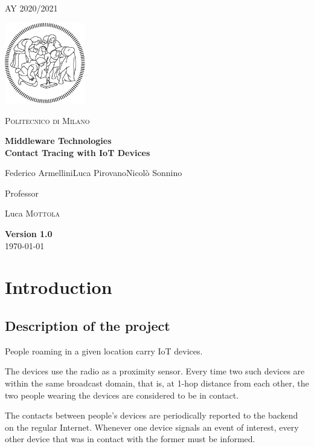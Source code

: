 \documentclass[table, 12pt]{article}
\begin{document}
\begin{titlepage}
    \centering
    {\scshape\large AY 2020/2021 \par}
    \vfill
    \includegraphics[width=100pt]{assets/logo-polimi-new}\par\vspace{1cm}
    {\scshape\LARGE Politecnico di Milano \par}
    \vspace{1.5cm}
    {\huge\bfseries Middleware Technologies\\Contact Tracing with IoT Devices\par}
    \vspace{2cm}
    {\Large {Federico Armellini\quad Luca Pirovano\quad Nicolò Sonnino}\par}
    \vfill
    {\large Professor\par
        Luca \textsc{Mottola}}
    \vfill
    {\large \textbf{Version 1.0}\\ \today \par}
\end{titlepage}
\thispagestyle{plain}
\mbox{}
\newpage
{}
\tableofcontents
\newpage
{}
\section{Introduction}
\subsection{Description of the project}
People roaming in a given location carry IoT devices.

The devices use the radio as a proximity sensor. Every time
two such devices are within the same broadcast domain, that is, at 1-hop distance from each other, the two
people wearing the devices are considered to be in contact.

The contacts between people’s devices are
periodically reported to the backend on the regular Internet. Whenever one device signals an event of interest,
every other device that was in contact with the former must be informed.
\end{document}
